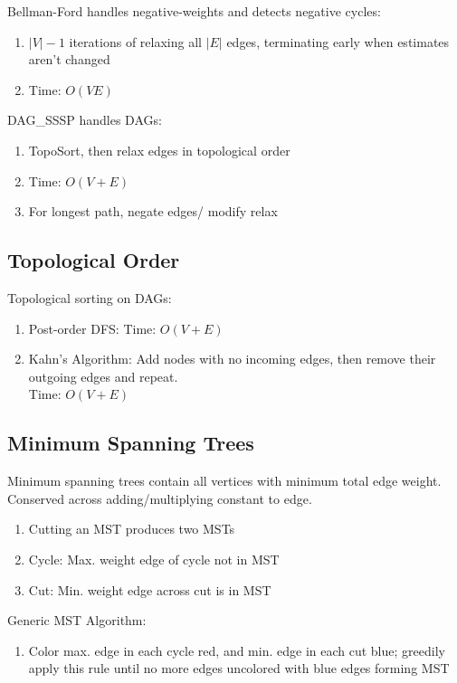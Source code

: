 \documentclass[12pt, a4paper]{article}
\begin{document}
\begin{multicols*}{3}
Bellman-Ford handles negative-weights and detects negative cycles:
\begin{enumerate}[\roman*.]
  \item $|V|-1$ iterations of relaxing all $|E|$ edges, terminating early when estimates aren't changed
  \item Time: $O(VE)$
\end{enumerate}

DAG\_SSSP handles DAGs:
\begin{enumerate}[\roman*.]
  \item TopoSort, then relax edges in topological order 
  \item Time: $O(V+E)$
  \item For longest path, negate edges/ modify relax
\end{enumerate}

\colbreak
\subsection{Topological Order}

Topological sorting on DAGs:
\begin{enumerate}[\roman*.]
  \item Post-order DFS: Time: $O(V+E)$
  \item Kahn's Algorithm: Add nodes with no incoming edges, then remove their outgoing edges and repeat.\\
    Time: $O(V+E)$
\end{enumerate}

\subsection{Minimum Spanning Trees}
Minimum spanning trees contain all vertices with minimum total edge weight. Conserved across adding/multiplying constant to edge.
\begin{enumerate}[\roman*.]
  \item Cutting an MST produces two MSTs
  \item Cycle: Max. weight edge of cycle not in MST
  \item Cut: Min. weight edge across cut is in MST 
\end{enumerate}

Generic MST Algorithm:
\begin{enumerate}[\roman*.]
  \item Color max. edge in each cycle red, and min. edge in each cut blue; greedily apply this rule until no more edges uncolored with blue edges forming MST 
\end{enumerate}


\end{multicols*}
\end{document}
